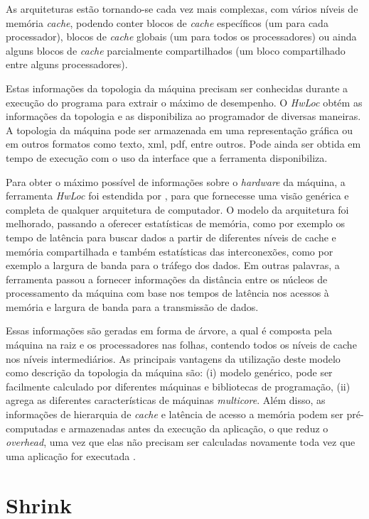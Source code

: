 \documentclass[diss,capa]{texufpel}
\begin{document}
As arquiteturas estão tornando-se cada vez mais complexas, com vários níveis de memória \emph{cache}, podendo conter blocos de \emph{cache} específicos (um para cada processador), blocos de \emph{cache} globais (um para todos os processadores) ou ainda alguns blocos de \emph{cache} parcialmente compartilhados (um bloco compartilhado entre alguns processadores).

Estas informações da topologia da máquina precisam ser conhecidas durante a execução do programa para extrair o máximo de desempenho. O \emph{HwLoc} obtém as informações da topologia e as disponibiliza ao programador de diversas maneiras. A topologia da máquina pode ser armazenada em uma representação gráfica ou em outros formatos como texto, xml, pdf, entre outros. Pode ainda ser obtida em tempo de execução com o uso da interface que a ferramenta disponibiliza.

Para obter o máximo possível de informações sobre o \emph{hardware} da máquina, a ferramenta \emph{HwLoc} foi estendida por \cite{Pilla_laercio2014}, para que fornecesse uma visão genérica e completa de qualquer arquitetura de computador. O modelo da arquitetura foi melhorado, passando a oferecer estatísticas de memória, como por exemplo os tempo de latência para buscar dados a partir de diferentes níveis de cache e memória compartilhada e também estatísticas das interconexões, como por exemplo a largura de banda para o tráfego dos dados. Em outras palavras, a ferramenta passou a fornecer informações da distância entre os núcleos de processamento da máquina com base nos tempos de latência nos acessos à memória e largura de banda para a transmissão de dados.

Essas informações são geradas em forma de árvore, a qual é composta pela máquina na raiz e os processadores nas folhas, contendo todos os níveis de cache nos níveis intermediários. As principais vantagens da utilização deste modelo como descrição da topologia da máquina são: (i) modelo genérico, pode ser facilmente calculado por diferentes máquinas e bibliotecas de programação, (ii) agrega as diferentes características de máquinas \emph{multicore}. Além disso, as informações de hierarquia de \emph{cache} e latência de acesso a memória podem ser pré-computadas e armazenadas antes da execução da aplicação, o que reduz o \emph{overhead}, uma vez que elas não precisam ser calculadas novamente toda vez que uma aplicação for executada \cite{Pilla_laercio2014}.


\chapter{Shrink}
\end{document}
